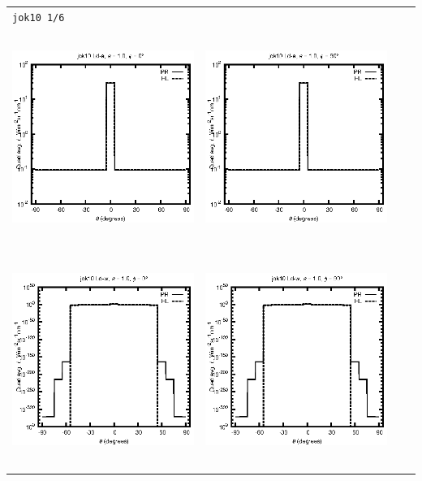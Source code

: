 \documentclass[10pt,a4paper]{article}
\begin{document}
\begin{adjustwidth}{-1.2in}{-1.2in}
\begin{tabular}{c c c c}
\multicolumn{4}{l}{\texttt{jok10 1/6}} \\
\includegraphics[height=7cm]{../eps/jok10_Ld_a_fwd.eps} &
\includegraphics[height=7cm]{../eps/jok10_Ld_a_cross.eps}\\
\includegraphics[height=7cm]{../eps/jok10_Ld_w_fwd.eps} &
\includegraphics[height=7cm]{../eps/jok10_Ld_w_cross.eps} \\

\end{tabular}
\end{adjustwidth}
\end{document}
